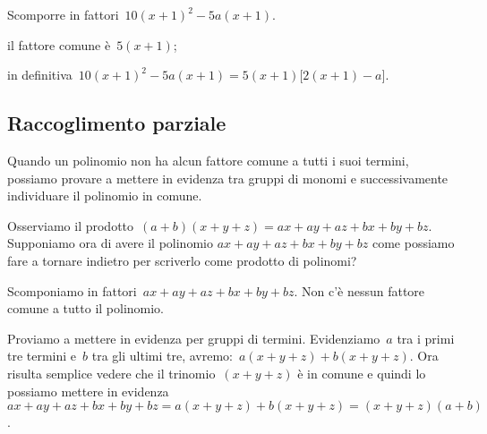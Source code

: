  \begin{esempio}
Scomporre in fattori~\(10(x+1)^{2}-5a(x+1)\).
  \begin{enumeratea}
  \item il fattore comune è~\(5(x+1)\);
  \item in definitiva~\(10(x+1)^{2}-5a(x+1)=5(x+1)\bigl[2(x+1)-a \bigr]\).
  \end{enumeratea}
 \end{esempio}


% 

\subsection{Raccoglimento parziale}
\label{subsec:divpol_raccoglimentoparziale}

Quando un polinomio non ha alcun fattore comune a tutti i suoi termini, 
possiamo provare a mettere in evidenza tra gruppi di monomi
e successivamente individuare il polinomio in comune.

Osserviamo il prodotto~\((a+b)(x+y+z)=ax+ay+az+bx+by+bz\). Supponiamo ora di 
avere il polinomio \(ax+ay+az+bx+by+bz\) come possiamo fare a tornare indietro 
per scriverlo come prodotto di polinomi?

 \begin{esempio}
Scomponiamo in fattori~\(ax+ay+az+bx+by+bz\). Non c'è nessun fattore comune a 
tutto il polinomio.

Proviamo a mettere in evidenza per gruppi di termini. Evidenziamo~\(a\) tra i 
primi tre termini e~\(b\) tra gli ultimi tre, 
avremo:~\(a(x+y+z)+b(x+y+z)\). Ora risulta semplice vedere che il 
trinomio~\((x+y+z)\) è in comune e quindi lo possiamo mettere 
in evidenza~\(ax+ay+az+bx+by+bz=a(x+y+z)+b(x+y+z)=(x+y+z)(a+b)\).
 \end{esempio}

